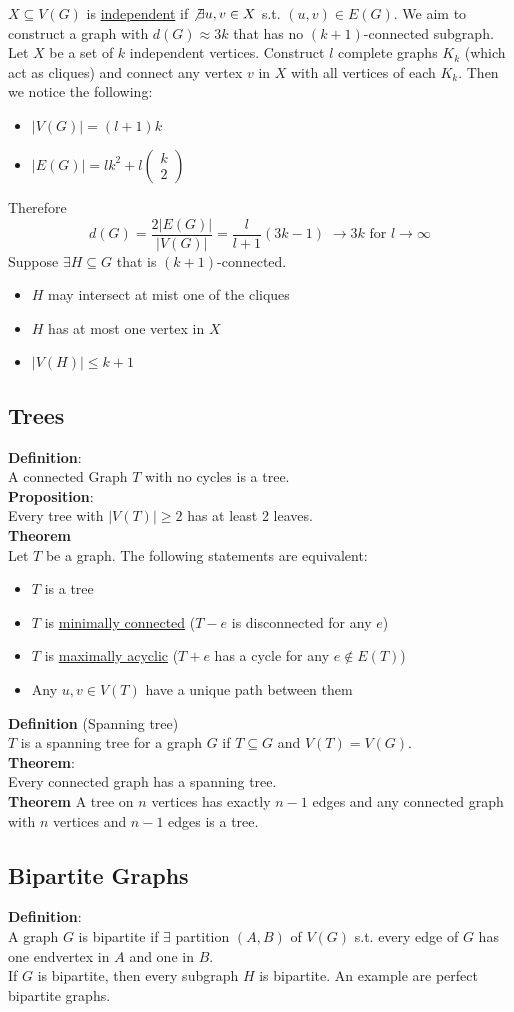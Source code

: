 \documentclass[a4paper, 12pt]{article}
\begin{document}
	$X\subseteq V(G)$ is \underline{independent} if $\not\exists u,v \in X$ s.t. $(u,v) \in E(G)$. We aim to construct a graph with $d(G) \approx 3k$ that has no $(k+1)$-connected subgraph. Let $X$ be a set of $k$ independent vertices. Construct $l$ complete graphs $K_k$ (which act as cliques) and connect any vertex $v$ in $X$ with all vertices of each $K_k$. Then we notice the following: \begin{itemize}
		\item $\left|V(G)\right| = (l+1)k$
		\item $\left|E(G)\right| = lk^2 + l\begin{pmatrix}
			k\\2
		\end{pmatrix}$
	\end{itemize}
	Therefore \[d(G) = \frac{2\left|E(G)\right|}{\left|V(G)\right|} = \frac{l}{l+1}(3k-1) \; \to 3k \text{ for } l \to \infty\]
	Suppose $\exists H \subseteq G$ that is $(k+1)$-connected. \begin{itemize}
		\item $H$ may intersect at mist one of the cliques
		\item $H$ has at most one vertex in $X$
		\item $\left|V(H)\right| \leq k+1$
	\end{itemize}
	\subsection{Trees}
	\textbf{Definition}:\\
	A connected Graph $T$ with no cycles is a tree.\\
	\textbf{Proposition}:\\
	Every tree with $\left|V(T)\right| \geq 2$ has at least 2 leaves.\\
	\textbf{Theorem}\\
	Let $T$ be a graph. The following statements are equivalent:\begin{itemize}
		\item $T$ is a tree
		\item $T$ is \underline{minimally connected} ($T-e$ is disconnected for any $e$)
		\item $T$ is \underline{maximally acyclic} ($T+e$ has a cycle for any $e \notin E(T)$)
		\item Any $u,v \in V(T)$ have a unique path between them
	\end{itemize}
	\textbf{Definition} (Spanning tree)\\
	$T$ is a spanning tree for a graph $G$ if $T\subseteq G$ and $V(T) = V(G)$.\\
	\textbf{Theorem}:\\
	Every connected graph has a spanning tree.\\
	\textbf{Theorem}
	A tree on $n$ vertices has exactly $n-1$ edges and any connected graph with $n$ vertices and $n-1$ edges is a tree.
	\subsection{Bipartite Graphs}
	\textbf{Definition}:\\
	A graph $G$ is bipartite if $\exists$ partition $(A,B)$ of $V(G)$ s.t. every edge of $G$ has one endvertex in $A$ and one in $B$.\\
	If $G$ is bipartite, then every subgraph $H$ is bipartite. An example are perfect bipartite graphs.
	
\end{document}
